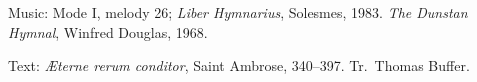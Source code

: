 


\begin{hymnsource}
Music: Mode I, melody 26; \emph{Liber Hymnarius}, Solesmes, 1983. \emph{The Dunstan Hymnal}, Winfred Douglas, 1968.

Text: \emph{Æterne rerum conditor}, Saint Ambrose, 340--397. Tr.~Thomas Buffer.
\end{hymnsource}
